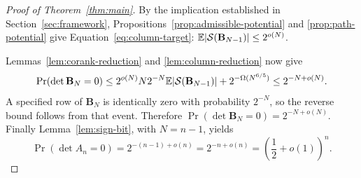 \begin{proof}[Proof of Theorem~\ref{thm:main}]
By the implication established in Section~\ref{sec:framework},
Propositions~\ref{prop:admissible-potential} and \ref{prop:path-potential}
give Equation~\eqref{eq:column-target}:
\(\mathbb E|\mathcal S(\mathbf B_{N-1})|\le2^{o(N)}\).

Lemmas~\ref{lem:corank-reduction} and \ref{lem:column-reduction} now
give
\[
 \Pr(\det\mathbf B_N=0)
 \le2^{o(N)}N2^{-N}\mathbb E|\mathcal S(\mathbf B_{N-1})|
       +2^{-\Omega(N^{6/5})}
 \le2^{-N+o(N)}.
\]
A specified row of \(\mathbf B_N\) is identically zero with probability
\(2^{-N}\), so the reverse bound follows from that event. Therefore
\(\Pr(\det\mathbf B_N=0)=2^{-N+o(N)}\).
Finally Lemma~\ref{lem:sign-bit}, with \(N=n-1\), yields
\[
 \Pr(\det A_n=0)=2^{-(n-1)+o(n)}
                =2^{-n+o(n)}
                =\left(\frac12+o(1)\right)^n.
\]
\end{proof}
